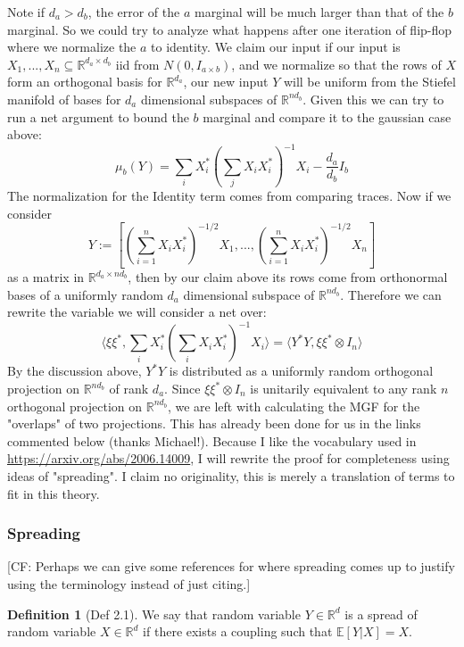 \documentclass[aos]{imsart}
\theoremstyle{definition}
\newtheorem{definition}{Definition}
\newcommand{\R}{{\mathbb{R}}}
\newcommand{\E}{\mathbb{E}}
\newcommand{\CF}[1]{{\color{purple}[CF: #1]}}
\begin{document}
Note if $d_{a} > d_{b}$, the error of the $a$ marginal will be much larger than that of the $b$ marginal. So we could try to analyze what happens after one iteration of flip-flop where we normalize the $a$ to identity. We claim our input if our input is $X_{1}, ..., X_{n} \subseteq \R^{d_{a} \times d_{b}}$ iid from $N(0,I_{a \times b})$, and we normalize so that the rows of $X$ form an orthogonal basis for $\R^{d_{a}}$, our new input $Y$ will be uniform from the Stiefel manifold of bases for $d_{a}$ dimensional subspaces of $\R^{nd_{b}}$. Given this we can try to run a net argument to bound the $b$ marginal and compare it to the gaussian case above:
\[ \mu_{b}(Y) = \sum_{i} X_{i}^{*} \left( \sum_{j} X_{i} X_{i}^{*} \right)^{-1} X_{i} - \frac{d_{a}}{d_{b}} I_{b}      \]
The normalization for the Identity term comes from comparing traces. Now if we consider
\[ Y := \left[ \left( \sum_{i=1}^{n} X_{i} X_{i}^{*} \right)^{-1/2} X_{1}, ..., \left( \sum_{i=1}^{n} X_{i} X_{i}^{*} \right)^{-1/2} X_{n}     \right]   \]
as a matrix in $\R^{d_{a} \times nd_{b}}$, then by our claim above its rows come from orthonormal bases of a uniformly random $d_{a}$ dimensional subspace of $\R^{n d_{b}}$. Therefore we can rewrite the variable we will consider a net over:
\[ \langle \xi \xi^{*}, \sum_{i} X_{i}^{*} \left( \sum_{i} X_{i} X_{i}^{*}  \right)^{-1} X_{i} \rangle = \langle Y^{*} Y, \xi \xi^{*} \otimes I_{n}   \rangle     \]
By the discussion above, $Y^{*} Y$ is distributed as a uniformly random orthogonal projection on $\R^{n d_{b}}$ of rank $d_{a}$. Since $\xi \xi^{*} \otimes I_{n}$ is unitarily equivalent to any rank $n$ orthogonal projection on $\R^{n d_{b}}$, we are left with calculating the MGF for the "overlaps" of two projections. This has already been done for us in the links commented below (thanks Michael!).
Because I like the vocabulary used in \url{https://arxiv.org/abs/2006.14009}, I will rewrite the proof for completeness using ideas of "spreading". I claim no originality, this is merely a translation of terms to fit in this theory.

\subsubsection{Spreading}
\CF{Perhaps we can give some references for where spreading comes up to justify using the terminology instead of just citing.}

\begin{definition} [Def 2.1]
We say that random variable $Y \in \R^{d}$ is a spread of random variable $X \in \R^{d}$ if
there exists a coupling such that $\E[Y |X] = X$.
\end{definition}
\end{document}
